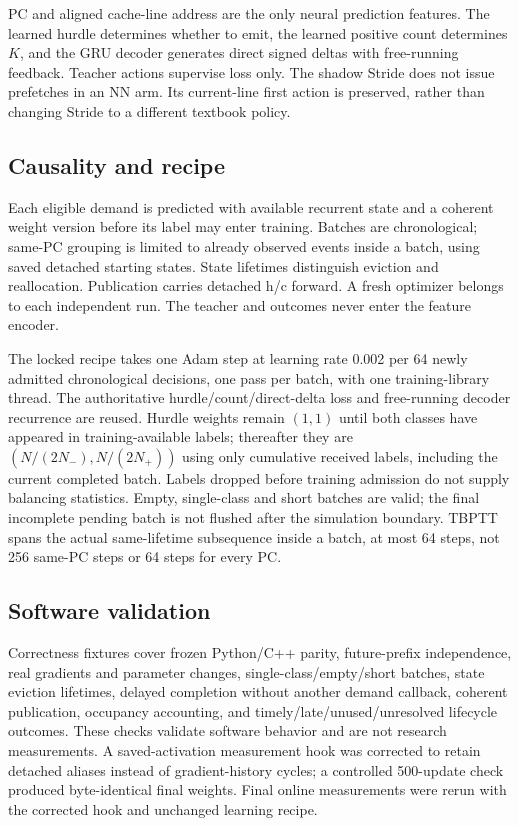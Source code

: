 \documentclass[10pt]{article}
\begin{document}
PC and aligned cache-line address are the only neural prediction features. The learned hurdle determines whether to emit, the learned positive count determines $K$, and the GRU decoder generates direct signed deltas with free-running feedback. Teacher actions supervise loss only. The shadow Stride does not issue prefetches in an NN arm. Its current-line first action is preserved, rather than changing Stride to a different textbook policy.

\subsection{Causality and recipe}

Each eligible demand is predicted with available recurrent state and a coherent weight version before its label may enter training. Batches are chronological; same-PC grouping is limited to already observed events inside a batch, using saved detached starting states. State lifetimes distinguish eviction and reallocation. Publication carries detached h/c forward. A fresh optimizer belongs to each independent run. The teacher and outcomes never enter the feature encoder.

The locked recipe takes one Adam step at learning rate 0.002 per 64 newly admitted chronological decisions, one pass per batch, with one training-library thread. The authoritative hurdle/count/direct-delta loss and free-running decoder recurrence are reused. Hurdle weights remain $(1,1)$ until both classes have appeared in training-available labels; thereafter they are $(N/(2N_-),N/(2N_+))$ using only cumulative received labels, including the current completed batch. Labels dropped before training admission do not supply balancing statistics. Empty, single-class and short batches are valid; the final incomplete pending batch is not flushed after the simulation boundary. TBPTT spans the actual same-lifetime subsequence inside a batch, at most 64 steps, not 256 same-PC steps or 64 steps for every PC.

\subsection{Software validation}

Correctness fixtures cover frozen Python/C++ parity, future-prefix independence, real gradients and parameter changes, single-class/empty/short batches, state eviction lifetimes, delayed completion without another demand callback, coherent publication, occupancy accounting, and timely/late/unused/unresolved lifecycle outcomes. These checks validate software behavior and are not research measurements. A saved-activation measurement hook was corrected to retain detached aliases instead of gradient-history cycles; a controlled 500-update check produced byte-identical final weights. Final online measurements were rerun with the corrected hook and unchanged learning recipe.
\end{document}
